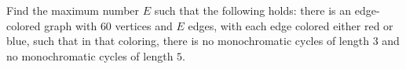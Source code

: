 Find the maximum number $E$ such that the following holds: there is an edge-colored graph with $60$ vertices and $E$ edges, with each edge colored either red or blue, such that in that coloring, there is no monochromatic cycles of length $3$ and no monochromatic cycles of length $5$.